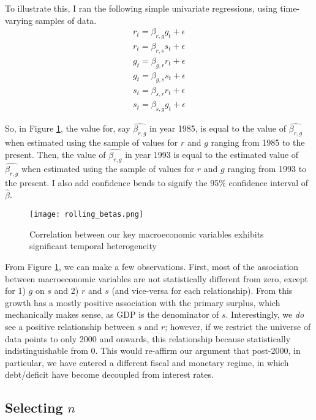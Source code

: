 \documentclass{article}
\begin{document}
To illustrate this, I ran the following simple univariate regressions, using time-varying samples of data. 
\begin{gather}
	r_t = \beta_{r, g} g_t + \epsilon \\
	r_t = \beta_{r, s} s_t + \epsilon \\
	g_t = \beta_{g, r} r_t + \epsilon \\
	g_t = \beta_{g, s} s_t + \epsilon \\
	s_t = \beta_{s, r} r_t + \epsilon \\
	s_t = \beta_{s, g} g_t + \epsilon
\end{gather}

So, in Figure \ref{fig:rolling_betas}, the value for, say $\hat{\beta_{r, g}}$ in year 1985, is equal to the value of $\hat{\beta_{r, g}}$ when estimated using the sample of values for $r$ and $g$ ranging from 1985 to the present. Then, the value of $\hat{\beta_{r, g}}$ in year 1993 is equal to the estimated value of $\hat{\beta_{r, g}}$ when estimated using the sample of values for $r$ and $g$ ranging from 1993 to the present. I also add confidence bends to signify the 95\% confidence interval of $\hat{\beta}$. 

\begin{figure}[htbp!]
\centering
	\texttt{[image: rolling\_betas.png]}
\caption{Correlation between our key macroeconomic variables exhibits significant temporal heterogeneity}
\label{fig:rolling_betas}
\end{figure}

From Figure \ref{fig:rolling_betas}, we can make a few observations. First, most of the association between macroeconomic variables are not statistically different from zero, except for 1) $g$ on $s$ and 2) $r$ and $s$ (and vice-versa for each relationship). From this growth has a mostly positive association with the primary surplus, which mechanically makes sense, as GDP is the denominator of $s$. Interestingly, we \textit{do} see a positive relationship between $s$ and $r$; however, if we restrict the universe of data points to only 2000 and onwards, this relationship because statistically indistinguishable from 0. This would re-affirm our argument that post-2000, in particular, we have entered a different fiscal and monetary regime, in which debt/deficit have become decoupled from interest rates. 

\subsection{Selecting $n$}
\end{document}
